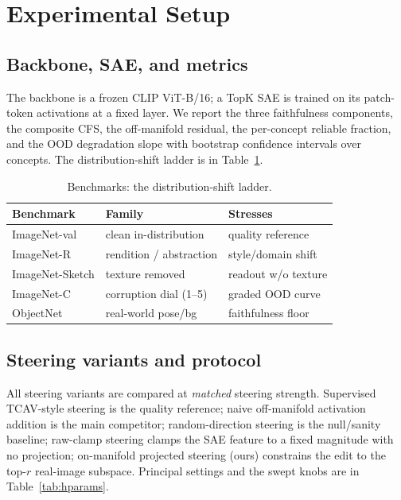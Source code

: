 \documentclass[conference]{IEEEtran}
\begin{document}
\section{Experimental Setup}

\subsection{Backbone, SAE, and metrics}
The backbone is a frozen CLIP ViT-B/16; a TopK SAE is trained on its patch-token activations at a fixed layer. We report the three faithfulness components, the composite CFS, the off-manifold residual, the per-concept reliable fraction, and the OOD degradation slope with bootstrap confidence intervals over concepts. The distribution-shift ladder is in Table~\ref{tab:data}.

\begin{table}[t]
\caption{Benchmarks: the distribution-shift ladder.}
\label{tab:data}
\centering
\setlength{\tabcolsep}{3pt}
\begin{tabular}{lll}
\toprule
Benchmark & Family & Stresses \\
\midrule
ImageNet-val & clean in-distribution & quality reference \\
ImageNet-R & rendition / abstraction & style/domain shift \\
ImageNet-Sketch & texture removed & readout w/o texture \\
ImageNet-C & corruption dial (1--5) & graded OOD curve \\
ObjectNet & real-world pose/bg & faithfulness floor \\
\bottomrule
\end{tabular}
\end{table}

\subsection{Steering variants and protocol}
All steering variants are compared at \emph{matched} steering strength. Supervised TCAV-style steering is the quality reference; naive off-manifold activation addition is the main competitor; random-direction steering is the null/sanity baseline; raw-clamp steering clamps the SAE feature to a fixed magnitude with no projection; on-manifold projected steering (ours) constrains the edit to the top-$r$ real-image subspace. Principal settings and the swept knobs are in Table~\ref{tab:hparams}.
\end{document}
